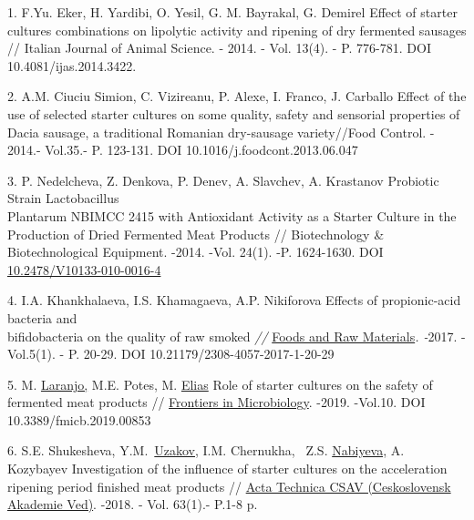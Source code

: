 \begin{references}
1. F.Yu. Eker, H. Yardibi, O. Yesil, G. M. Bayrakal, G. Demirel Effect
of starter cultures combinations on lipolytic activity and ripening of
dry fermented sausages // Italian Journal of Animal Science. - 2014. -
Vol. 13(4). - P. 776-781. DOI 10.4081/ijas.2014.3422.

2. A.M. Ciuciu Simion, C. Vizireanu, P. Alexe, I. Franco, J. Carballo
Effect of the use of selected starter cultures on some quality, safety
and sensorial properties of Dacia sausage, a traditional Romanian
dry-sausage variety//Food Control. - 2014.- Vol.35.- P. 123-131.
DOI 10.1016/j.foodcont.2013.06.047

3. P. Nedelcheva, Z. Denkova, P. Denev, A. Slavchev, A. Krastanov
Probiotic Strain Lactobacillus \\Plantarum NBIMCC 2415 with Antioxidant
Activity as a Starter Culture in the Production of Dried Fermented Meat
Products // Biotechnology \& Biotechnological Equipment. -2014. -Vol.
24(1). -P. 1624-1630. DOI
\href{https://doi.org/10.2478/V10133-010-0016-4}{10.2478/V10133-010-0016-4}

4. I.A. Khankhalaeva, I.S. Khamagaeva, A.P. Nikiforova Effects of
propionic-acid bacteria and \\bifidobacteria on the quality of raw smoked
\emph{//}
\href{https://library.kazatu.kz:2057/sourceid/21100777291}{Foods and Raw
Materials}\emph{. -}2017. - Vol.5(1). - P. 20-29. DOI
10.21179/2308-4057-2017-1-20-29

5. M.
\href{https://library.kazatu.kz:2057/authid/detail.uri?origin=resultslist&authorId=7801545833&zone=}{Laranjo,}
M.E. Potes, M.
\href{https://library.kazatu.kz:2057/authid/detail.uri?origin=resultslist&authorId=35086070100&zone=}{Elias}
Role of starter cultures on the safety of fermented meat products //
\href{https://library.kazatu.kz:2057/sourceid/21100226442?origin=resultslist}{Frontiers
in Microbiology}. -2019. -Vol.10. DOI 10.3389/fmicb.2019.00853

6. S.E. Shukesheva,
Y.M.~\href{https://library.kazatu.kz:2057/authid/detail.uri?origin=resultslist&authorId=55968622400&zone=}{Uzakov,}
I.M. Chernukha, ~Z.S.
\href{https://library.kazatu.kz:2057/authid/detail.uri?origin=resultslist&authorId=56031451100&zone=}{Nabiyeva,}
A. Kozybayev Investigation of the influence of starter cultures on the
acceleration ripening period finished meat products //
\href{https://library.kazatu.kz:2057/sourceid/13884?origin=resultslist}{Acta
Technica CSAV (Ceskoslovensk Akademie Ved)}. -2018. - Vol. 63(1).- P.1-8
p.


\end{references}
